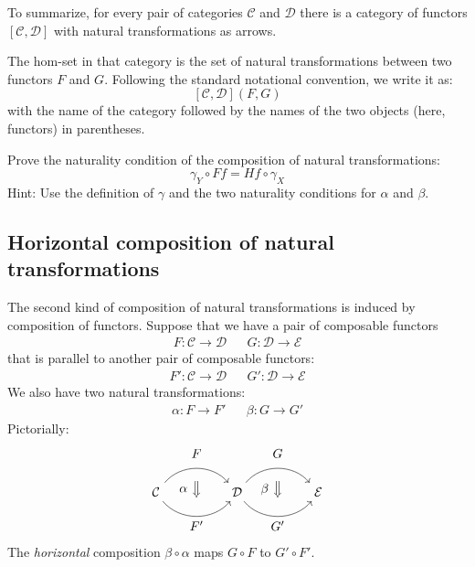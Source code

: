 \documentclass[DaoFP]{subfiles}
\begin{document}
To summarize, for every pair of categories $\mathcal{C}$ and $\mathcal{D}$ there is a category of functors $[\mathcal{C}, \mathcal{D}]$ with natural transformations as arrows. 

The hom-set in that category is the set of natural transformations between two functors $F$ and $G$. Following the standard notational convention, we write it as:
\[ [\mathcal{C}, \mathcal{D}](F, G) \]
with the name of the category followed by the names of the two objects (here, functors) in parentheses.


\begin{exercise}
Prove the naturality condition of the composition of natural transformations:
\[ \gamma_Y \circ F f = H f \circ \gamma_X \]
Hint: Use the definition of $\gamma$ and the two naturality conditions for $\alpha$ and $\beta$.
\end{exercise}

\subsection{Horizontal composition of natural transformations}

The second kind of composition of natural transformations is induced by composition of functors. Suppose that we have a pair of composable functors
\begin{align*}
 F \colon \mathcal{C} \to \mathcal{D}
&&G \colon \mathcal{D} \to \mathcal{E} 
\end{align*}
that is parallel to another pair of composable functors:
\begin{align*}
 F' \colon \mathcal{C} \to \mathcal{D}
&& G' \colon \mathcal{D} \to \mathcal{E} 
\end{align*}
We also have two natural transformations:
\begin{align*}
\alpha \colon F \to F'  
&& \beta \colon G \to G' 
\end{align*}
Pictorially:
\[
\begin{tikzcd}[column sep=huge]
\mathcal{C}
  \arrow[bend left=50]{r}[name=U, label=above:$F$]{}
  \arrow[bend right=50]{r}[name=D, label=below:$F'$]{} 
 &
\mathcal{D}
  \arrow[bend left=50]{r}[name=U1, label=above:$G$]{}
  \arrow[bend right=50]{r}[name=D1, label=below:$G'$]{} 
 &
\mathcal{E}
  \arrow[shorten <=10pt,shorten >=10pt,Rightarrow,to path={(U) -- node[label=left:$\alpha$] {} (D)}]{}
  \arrow[shorten <=10pt,shorten >=10pt,Rightarrow,to path={(U1) -- node[label=left:$\beta$] {} (D1)}]{}
\end{tikzcd}
\]
The \emph{horizontal} composition $\beta \circ \alpha$ maps $G \circ F$ to $G' \circ F'$.
\end{document}
